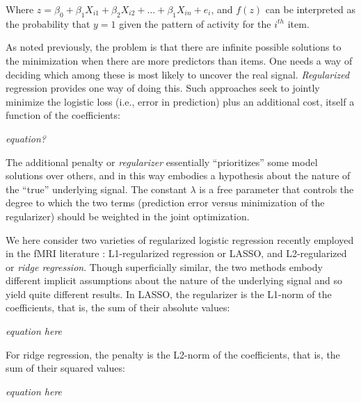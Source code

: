 Where $z = \beta_0 + \beta_1X_{i 1} + \beta_2X_{i 2} + \dots +  \beta_1X_{i n} + e_{i}$, and $f(z)$ can be interpreted as the probability that $y=1$ given the pattern of activity for the $i^{th}$ item. 

As noted previously, the problem is that there are infinite possible solutions to the minimization when there are more predictors than items. One needs a way of deciding which among these is most likely to uncover the real signal. {\em Regularized} regression provides one way of doing this. Such approaches seek to jointly minimize the logistic loss (i.e., error in prediction) plus an additional cost, itself a function of the coefficients:

{\em  equation?}

The additional penalty or {\em regularizer} essentially ``prioritizes'' some model solutions over others, and in this way embodies a hypothesis about the nature of the ``true'' underlying signal. The constant $\lambda$ is a free parameter that controls the degree to which the two terms (prediction error versus minimization of the regularizer) should be weighted in the joint optimization.

We here consider two varieties of regularized logistic regression recently employed in the fMRI literature \cite{XX}: L1-regularized regression or LASSO, and L2-regularized or {\em ridge regression}. Though superficially similar, the two methods embody different implicit assumptions about the nature of the underlying signal and so yield quite different results. In LASSO, the regularizer is the L1-norm of the coefficients, that is, the sum of their absolute values:

{\em  equation here}

For ridge regression, the penalty is the L2-norm of the coefficients, that is, the sum of their squared values:

{\em  equation here}

